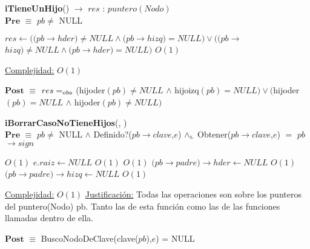 \begin{algorithm}[H]{\textbf{iTieneUnHijo}() $\to$ $res$ : $puntero(Nodo)$}
	{\\ $\textbf{Pre}$ $\equiv$ $pb \neq$ NULL}
	\begin{algorithmic}[1]

		\State $res \gets ((pb$$\rightarrow$$hder) \neq NULL \land (pb$$\rightarrow$$hizq) = NULL) \lor ((pb$$\rightarrow$$hizq) \neq NULL \land (pb$$\rightarrow$$hder) = NULL)$ \Comment $O(1)$

		\medskip
		\Statex \underline{Complejidad:} $O(1)$

    \end{algorithmic}
    {$\textbf{Post}$ $\equiv$ $res =_{\mathrm{obs}}$ (hijoder$(pb) \neq NULL$ $\land$ hijoizq$(pb) = NULL) \lor ($hijoder$(pb) = NULL$ $\land$ hijoder$(pb) \neq NULL)$}
\end{algorithm}


\begin{algorithm}[H]{\textbf{iBorrarCasoNoTieneHijos}(, )}
	{\\ $\textbf{Pre}$ $\equiv$ $pb \neq$ NULL $\land$ Definido?($pb$$\rightarrow$$clave$,$e$) $\land_{\mathrm{\scriptscriptstyle{L}}}$ Obtener($pb$$\rightarrow$$clave$,$e$) $=$ $pb$$\rightarrow$$sign$}
	\begin{algorithmic}[1]

		 \Comment $O(1)$
			\State $e.raiz \gets NULL$ \Comment $O(1)$
		\Else
			 \Comment $O(1)$
				\State $(pb$$\rightarrow$$padre)$$\rightarrow$$hder \gets NULL$ \Comment $O(1)$
			\Else
				\State $(pb$$\rightarrow$$padre)$$\rightarrow$$hizq \gets NULL$ \Comment $O(1)$
			\EndIf

		\EndIf

		\medskip
		\Statex \underline{Complejidad:} $O(1)$
		\Statex \underline{Justificación:} Todas las operaciones son sobre los punteros del puntero(Nodo) pb. Tanto las de esta función como las de las funciones llamadas dentro de ella.

    \end{algorithmic}
    {$\textbf{Post}$ $\equiv$ BuscoNodoDeClave(clave($pb$),$e$) = NULL}
\end{algorithm}


